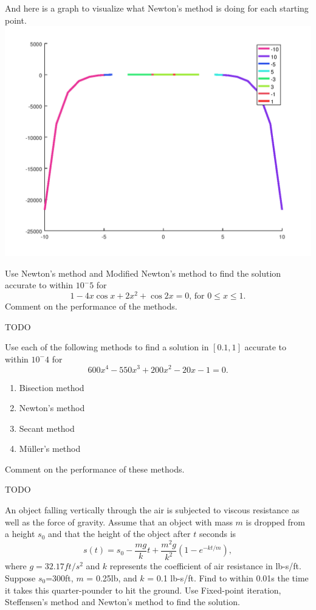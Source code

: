 \documentclass[10pt]{jhwhw}
\begin{document}
	\inputminted{text}{p4.results}

	And here is a graph to visualize what Newton's method is doing for each starting point.
	{\centering \includegraphics[scale=0.75]{p4.png}}

\problem{}

	Use Newton's method and Modified Newton's method to find the solution accurate to within $10^-5$ for
	$$
		1 - 4x\cos x + 2x^2 + \cos 2x = 0\text{, for }0 \leq x \leq 1.
	$$
	Comment on the performance of the methods.

\solution

	TODO

\problem{}

	Use each of the following methods to find a solution in $[0.1, 1]$ accurate to within $10^-4$ for
	$$
		600x^4 - 550x^3 + 200x^2 - 20x - 1 = 0.
	$$
	\begin{enumerate}
		\item Bisection method
		\item Newton's method
		\item Secant method
		\item M\"{u}ller's method
	\end{enumerate}
	Comment on the performance of these methods.

\solution

	TODO

\problem{}

\solution

	An object falling vertically through the air is subjected to viscous resistance as well as the
	force of gravity. Assume that an object with mass $m$ is dropped from a height $s_0$ and that the height of the
	object after $t$ seconds is
	$$
		s(t) = s_0 - \frac{mg}{k}t + \frac{m^2g}{k^2}(1-e^{-kt/m}),
	$$
	where $g=32.17 ft/s^2$ and $k$ represents the coefficient of air resistance in lb-s/ft.
	Suppose $s_0$=300ft, $m$ = 0.25lb, and $k$ = 0.1 lb-s/ft. Find to within 0.01s the time it takes
	this quarter-pounder to hit the ground. Use Fixed-point iteration, Steffensen's method and Newton's method
	to find the solution.
\end{document}
